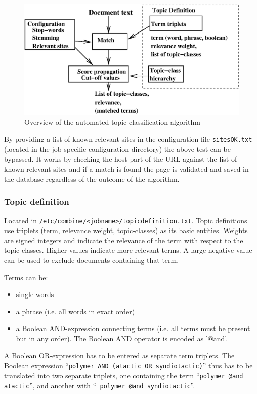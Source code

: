 \begin{figure}[htb]
\begin{center}
 \includegraphics[width=\textwidth]{TopicFilter.xfig.eps}
\end{center}
\caption{Overview of the automated topic classification algorithm}
\label{topicfilter}
\end{figure}

By providing a list of known relevant sites in the configuration
file {\tt sitesOK.txt} (located in the job specific configuration directory) the above test can be bypassed. It works by checking the host
part of the URL against the list of known relevant sites and if a
match is found the page is validated and saved in the database
regardless of the outcome of the algorithm.

\subsubsection{Topic definition}
\label{topicdef}
Located in {\tt /etc/combine/<jobname>/topicdefinition.txt}.
Topic definitions use triplets (term,
relevance weight, topic-classes) as its basic entities. Weights
are signed integers and indicate the relevance of the term with respect to
the topic-classes. Higher values indicate more relevant terms. A large
negative value can be used to exclude documents containing that term.

Terms can be:
\begin{itemize}
  \item single words
  \item a phrase (i.e. all words in exact order)
  \item a Boolean AND-expression connecting terms (i.e. all terms must
      be present but in any order). The Boolean AND operator is encoded as '@and'.
\end{itemize}
A Boolean OR-expression has to be entered as separate term triplets.
The Boolean expression ``{\tt polymer AND (atactic OR syndiotactic)}''
thus has to be translated into two separate triplets, one containing
the term ``{\tt polymer @and atactic}'', and another with ``{\tt
polymer @and syndiotactic}''.

